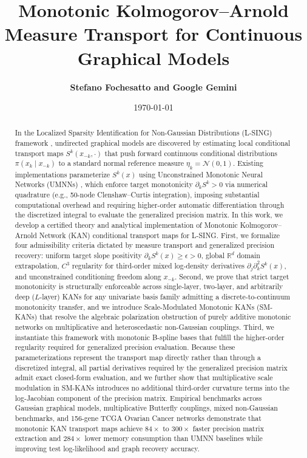 \documentclass[11pt,a4paper]{article}
\title{\textbf{Monotonic Kolmogorov--Arnold Measure Transport for Continuous Graphical Models}}
\author{\textbf{Stefano Fochesatto and Google Gemini}}
\date{\today}
\theoremstyle{plain}
\theoremstyle{definition}
\theoremstyle{remark}
\begin{document}
\maketitle

\begin{abstract}
In the Localized Sparsity Identification for Non-Gaussian Distributions (L-SING) framework \cite{liaw2025learning}, undirected graphical models are discovered by estimating local conditional transport maps $S^k(x_{-k}, \cdot)$ that push forward continuous conditional distributions $\pi(x_k \mid x_{-k})$ to a standard normal reference measure $\eta_k = \mathcal{N}(0, 1)$. Existing implementations parameterize $S^k(x)$ using Unconstrained Monotonic Neural Networks (UMNNs) \cite{wehenkel2019unconstrained}, which enforce target monotonicity $\partial_k S^k > 0$ via numerical quadrature (e.g., 50-node Clenshaw--Curtis integration), imposing substantial computational overhead and requiring higher-order automatic differentiation through the discretized integral to evaluate the generalized precision matrix. In this work, we develop a certified theory and analytical implementation of Monotonic Kolmogorov--Arnold Network (KAN) conditional transport maps for L-SING. First, we formalize four admissibility criteria dictated by measure transport and generalized precision recovery: uniform target slope positivity $\partial_k S^k(x) \ge \epsilon > 0$, global $\mathbb{R}^d$ domain extrapolation, $C^3$ regularity for third-order mixed log-density derivatives $\partial_j \partial_k^2 S^k(x)$, and unconstrained conditioning freedom along $x_{-k}$. Second, we prove that strict target monotonicity is structurally enforceable across single-layer, two-layer, and arbitrarily deep ($L$-layer) KANs for any univariate basis family admitting a discrete-to-continuum monotonicity transfer, and we introduce Scale-Modulated Monotonic KANs (SM-KANs) that resolve the algebraic polarization obstruction of purely additive monotonic networks on multiplicative and heteroscedastic non-Gaussian couplings. Third, we instantiate this framework with monotonic B-spline bases that fulfill the higher-order regularity required for generalized precision evaluation. Because these parameterizations represent the transport map directly rather than through a discretized integral, all partial derivatives required by the generalized precision matrix admit exact closed-form evaluation, and we further show that multiplicative scale modulation in SM-KANs introduces no additional third-order curvature terms into the log-Jacobian component of the precision matrix. Empirical benchmarks across Gaussian graphical models, multiplicative Butterfly couplings, mixed non-Gaussian benchmarks, and 156-gene TCGA Ovarian Cancer networks demonstrate that monotonic KAN transport maps achieve $84\times$ to $300\times$ faster precision matrix extraction and $284\times$ lower memory consumption than UMNN baselines while improving test log-likelihood and graph recovery accuracy.
\end{abstract}
\end{document}
